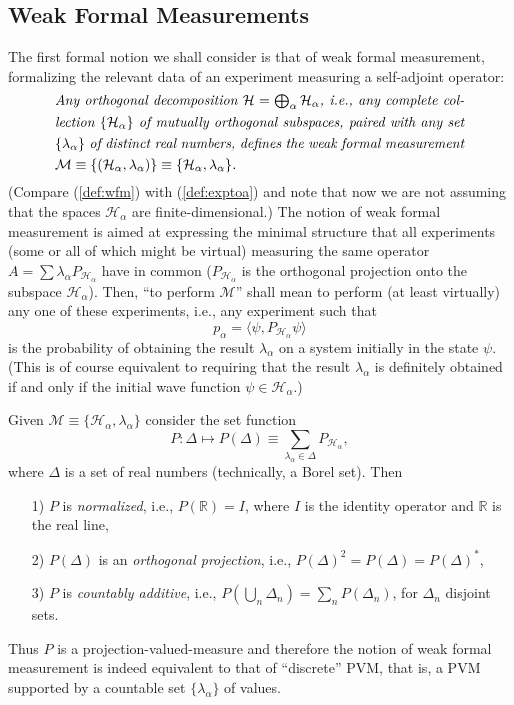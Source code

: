 \documentclass[12pt]{article}
\newcommand{\PV}{projection-valued-measure}
\renewcommand{\a}{\alpha}
\newcommand{\la}{\lambda_{\a}}
\newcommand{\biga}{\bigoplus_{\a}}
\newcommand{\Ha}{{\H}_{\a}}
\renewcommand{\H}{\mbox{$\mathcal{H}$}}
\newcommand{\Pa}{ P_{ {\mathcal{H}_{\a} } } }
\newcommand{\R}{\mathbb{R}}
\newcommand{\M}{\mbox{$\mathcal{M}$}}
\begin{document}
\subsection{Weak Formal Measurements}
\label{sec:MO}
The first formal notion we shall consider is that of weak formal
measurement, formalizing the relevant data of an experiment measuring
a self-adjoint operator:
\begin{equation}
\mbox{%
\begin{minipage}{0.85\textwidth}\openup 1.4\jot
   \setlength{\baselineskip}{12pt}\emph{Any orthogonal decomposition
     ${\H}=\biga {\Ha}$, i.e., any complete collection $\{ \Ha\}$ of
     mutually orthogonal subspaces, paired with any set $\{\la \}$ of
     distinct real numbers, defines the weak formal measurement
     $\M\equiv\{(\Ha, \la )\}\equiv\{\Ha, \la \}$.}
   \end{minipage}}
\label{def:wfm}
\end{equation}
(Compare (\ref{def:wfm}) with (\ref{def:exptoa}) and note that now we
are not assuming that the spaces $\Ha$ are finite-dimensional.)  The
notion of weak formal measurement is aimed at expressing the minimal
structure that all experiments (some or all of which might be virtual)
measuring the same operator $A= \sum\la\Pa$ have in common ($\Pa$ is
the orthogonal projection onto the subspace $\Ha$).  Then, ``to
perform \M'' shall mean to perform (at least virtually) any one of
these experiments, i.e., any experiment such that
\begin{equation}
p_{\a}=\langle \psi, \Pa\psi \rangle
\label{eq:prdeltass}
\end{equation}
is the probability of obtaining the result $\la$ on a system initially
in the state $\psi$.  (This is of course equivalent to requiring that
the result $\la$ is definitely obtained if and only if the initial
wave function $\psi\in \Ha$.)

Given $\M\equiv\{\Ha, \la \}$ consider the set function
\begin{equation}
P:\Delta\mapsto P (\Delta)\equiv \sum_{\la\in \Delta} \Pa,
\label{eq:disfr}
\end{equation}
where $\Delta$ is a set of real numbers (technically, a Borel set).
Then
\begin{itemize}
\item[1)] $P$ is \emph{normalized}, i.e., $P(\R)= I$, where $I$ is the
   identity operator and $\R$ is the real line,

\item[2)] $P(\Delta)$ is an \emph{orthogonal projection}, i.e.,
   $P(\Delta)^{2}=P(\Delta)=P(\Delta)^{*}$,

\item[3)] $P$ is \emph{countably additive}, i.e., $ P(\bigcup_{n}
   \Delta_n) = \sum_{n} P(\Delta_n)$, for $\Delta_n$ disjoint sets.
\end{itemize}
Thus $P$ is a \PV{} and therefore the notion of weak formal
measurement is indeed equivalent to that of ``discrete'' PVM, that is,
a PVM supported by a countable set $\{\la\}$ of values.
\end{document}
